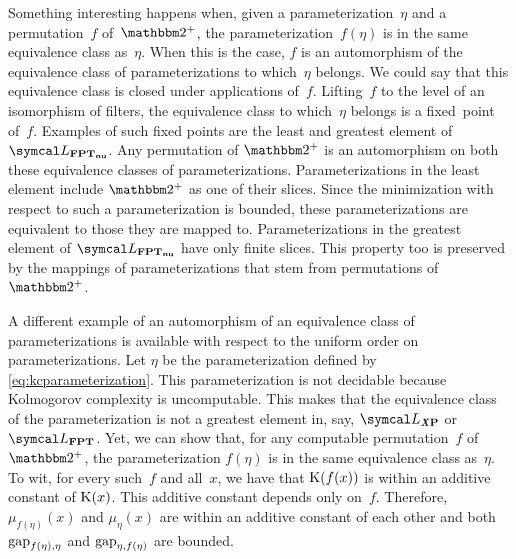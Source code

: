 Something interesting happens when, given a parameterization~$\eta$ and a permutation~$f$ of~$\binary^+$, the parameterization~$f(\eta)$ is in the same equivalence class as~$\eta$.
When this is the case, $f$ is an automorphism of the equivalence class of parameterizations to which~$\eta$ belongs.
We could say that this equivalence class is closed under applications of~$f$.
Lifting~$f$ to the level of an isomorphism of filters, the equivalence class to which~$\eta$ belongs is a fixed~point of~$f$.
Examples of such fixed points are the least and greatest element of $\calL_\clnu{FPT}$.
Any permutation of $\binary^+$ is an automorphism on both these equivalence classes of parameterizations.
Parameterizations in the least element include $\binary^+$ as one of their slices.
Since the minimization with respect to such a parameterization is bounded, these parameterizations are equivalent to those they are mapped to.
Parameterizations in the greatest element of $\calL_\clnu{FPT}$ have only finite slices.
This property too is preserved by the mappings of parameterizations that stem from permutations of $\binary^+$.
\begin{example}
  A different example of an automorphism of an equivalence class of parameterizations is available with respect to the uniform order on parameterizations.
  Let $\eta$ be the parameterization defined by \eqref{eq:kcparameterization}.
  This parameterization is not decidable because Kolmogorov complexity is uncomputable.
  This makes that the equivalence class of the parameterization is not a greatest element in, say, $\calL_\clX{P}$ or $\calL_\cl{FPT}$.
  Yet, we can show that, for any computable permutation~$f$ of $\binary^+$, the parameterization $f(\eta)$ is in the same equivalence class as~$\eta$.
  To wit, for every such~$f$ and all~$x$, we have that $\operatorname{K}(f(x))$ is within an additive constant of $\operatorname{K}(x)$.
  This additive constant depends only on~$f$.
  Therefore, $\mu_{f(\eta)}(x)$ and $\mu_\eta(x)$ are within an additive constant of each other and both $\operatorname{gap}_{f(\eta), \eta}$ and $\operatorname{gap}_{\eta, f(\eta)}$ are bounded.
\end{example}

